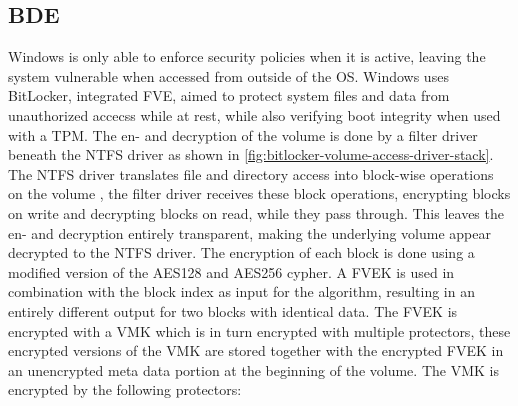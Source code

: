 \subsection{\acf{BDE}}
\label{sec:windows:security:bde}
Windows is only able to enforce security policies when it is active, leaving the system vulnerable when accessed from outside of the \ac{OS}\cite[9. BitLocker Drive encryption]{windows-internals-6-part2}.
Windows uses BitLocker, integrated \ac{FVE}, aimed to protect system files and data from unauthorized accecss while at rest\cite{microsoft-bitlocker-overview}, while also verifying boot integrity when used with a \ac{TPM}\cite[9. BitLocker Drive encryption]{windows-internals-6-part2}.
The en- and decryption of the volume is done by a filter driver beneath the \ac{NTFS} driver as shown in \autoref{fig:bitlocker-volume-access-driver-stack}.
The \ac{NTFS} driver translates file and directory access into block-wise operations on the volume , the filter driver receives these block operations, encrypting blocks on write and decrypting blocks on read, while they pass through.
This leaves the en- and decryption entirely transparent, making the underlying volume appear decrypted to the \ac{NTFS} driver\cite[9. Full-Volume Encryption Driver]{windows-internals-6-part2}.
The encryption of each block is done using a modified version of the \ac{AES}128 and \ac{AES}256 cypher\cite[9. Encryption Keys]{windows-internals-6-part2}.
A \ac{FVEK} is used in combination with the block index as input for the algorithm, resulting in an entirely different output for two blocks with identical data\cite[9. Full-Volume Encryption Driver]{windows-internals-6-part2}.
The \ac{FVEK} is encrypted with a \ac{VMK} which is in turn encrypted with multiple protectors, these encrypted versions of the \ac{VMK} are stored together with the encrypted \ac{FVEK} in an unencrypted meta data portion at the beginning of the volume\cite[9. Encryption Keys]{windows-internals-6-part2}.
The \ac{VMK} is encrypted by the following protectors:

